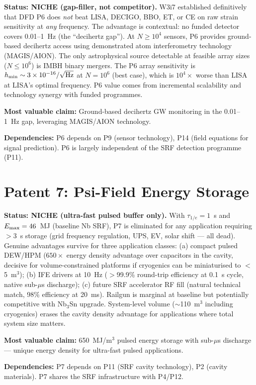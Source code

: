 \documentclass[11pt]{article}
\newcommand{\ee}[1]{\times 10^{#1}}
\begin{document}
\begin{tcolorbox}[colback=yellow!5!white, colframe=yellow!60!black,
  title=\textbf{P6: NICHE --- Resource Allocation: 1/5}]
\textbf{Status: NICHE (gap-filler, not competitor).}
W3i7 established definitively that DFD P6 does \emph{not} beat LISA,
DECIGO, BBO, ET, or CE on raw strain sensitivity at \emph{any}
frequency. The advantage is contextual: no funded detector covers
0.01--1~Hz (the ``decihertz gap''). At $N \geq 10^4$ sensors, P6
provides ground-based decihertz access using demonstrated atom
interferometry technology (MAGIS/AION). The only astrophysical source
detectable at feasible array sizes ($N \leq 10^6$) is IMBH binary
mergers. The P6 array sensitivity is $h_{\rm min} \sim 3\ee{-16}
/\sqrt{\rm Hz}$ at $N = 10^6$ (best case), which is $10^4\times$
worse than LISA at LISA's optimal frequency. P6 value comes from
incremental scalability and technology synergy with funded programmes.

\textbf{Most valuable claim:} Ground-based decihertz GW monitoring
in the 0.01--1~Hz gap, leveraging MAGIS/AION technology.

\textbf{Dependencies:} P6 depends on P9 (sensor technology), P14
(field equations for signal prediction). P6 is largely independent
of the SRF detection programme (P11).
\end{tcolorbox}

\section{Patent 7: Psi-Field Energy Storage}
\label{sec:P7}

\begin{tcolorbox}[colback=yellow!5!white, colframe=yellow!60!black,
  title=\textbf{P7: NICHE --- Resource Allocation: 2/5}]
\textbf{Status: NICHE (ultra-fast pulsed buffer only).}
With $\tau_{1/e} = 1$~s and $E_{\rm max} = 46$~MJ (baseline Nb SRF),
P7 is eliminated for any application requiring $>$3~s storage (grid
frequency regulation, UPS, EV, solar shift --- all dead). Genuine
advantages survive for three application classes: (a) compact pulsed
DEW/HPM ($650\times$ energy density advantage over capacitors in the
cavity, decisive for volume-constrained platforms if cryogenics can
be miniaturised to $<$5~m$^3$); (b) IFE drivers at 10~Hz ($>$99.9\%
round-trip efficiency at 0.1~s cycle, native sub-$\mu$s discharge);
(c) future SRF accelerator RF fill (natural technical match, 98\%
efficiency at 20~ms). Railgun is marginal at baseline but potentially
competitive with Nb$_3$Sn upgrade. System-level volume ($\sim$110~m$^3$
including cryogenics) erases the cavity density advantage for
applications where total system size matters.

\textbf{Most valuable claim:} 650~MJ/m$^3$ pulsed energy storage with
sub-$\mu$s discharge --- unique energy density for ultra-fast pulsed
applications.

\textbf{Dependencies:} P7 depends on P11 (SRF cavity technology),
P2 (cavity materials). P7 shares the SRF infrastructure with P4/P12.
\end{tcolorbox}
\end{document}
